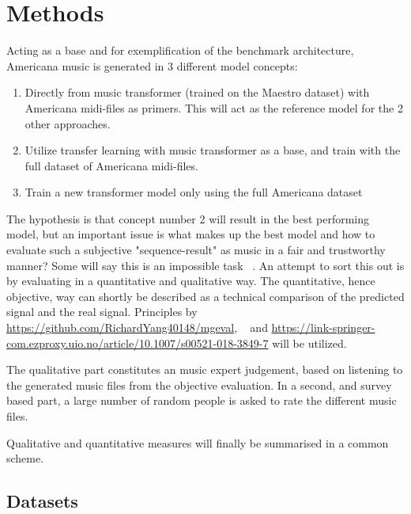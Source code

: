 \documentclass{article}
\begin{document}
    \section{Methods}

        Acting as a base and for exemplification of the benchmark architecture,
        Americana music is generated in 3 different model concepts:
        \begin{enumerate}
            \item Directly from music transformer (trained on the Maestro dataset)
                    with Americana midi-files as primers.
                    This will act as the reference model for the 2 other approaches.
            \item Utilize transfer learning with music transformer as a base, and
                    train with the full dataset of Americana midi-files.
            \item Train a new transformer model only using the full Americana dataset
        \end{enumerate} 
        
        The hypothesis is that concept number 2 will result in the best performing model,
        but an important issue is what makes up the best model and how to evaluate such a
        subjective "sequence-result" as music in a fair and trustworthy manner?
        Some will say this is an impossible task ~\cite{1030094}.
        An attempt to sort this out is by evaluating in a quantitative and qualitative way.
        The quantitative, hence objective, way can shortly be described as a technical
        comparison of the predicted signal and the real signal. Principles by
        \url{https://github.com/RichardYang40148/mgeval}, ~\cite{wu2020jazz} and
        \url{https://link-springer-com.ezproxy.uio.no/article/10.1007/s00521-018-3849-7} will be utilized.
        
        The qualitative part constitutes an music expert judgement,
        based on listening to the generated music files from the objective evaluation.
        In a second, and survey based part, a large number of random people is asked
        to rate the different music files.
        
        Qualitative and quantitative measures will finally be summarised in a common scheme.
        
    \subsection{Datasets}
    
\end{document}
